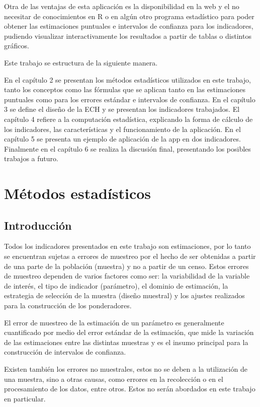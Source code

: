 \documentclass[12pt,twoside,spanish,a4paper]{book}\usepackage[]{graphicx}\usepackage[]{color}
\begin{document}
Otra de las ventajas de esta aplicación es la disponibilidad en la web y el no necesitar de conocimientos en R o en algún otro programa estadístico para poder obtener las estimaciones puntuales e intervalos de confianza para los indicadores, pudiendo visualizar interactivamente los resultados a partir de tablas o distintos gráficos.

Este trabajo se estructura de la siguiente manera.

En el capítulo 2 se presentan los métodos estadísticos utilizados en este trabajo, tanto los conceptos como las fórmulas que se aplican tanto en las estimaciones puntuales como para los errores estándar e intervalos de confianza. En el capítulo 3 se define el diseño de la ECH y se presentan los indicadores trabajados. El capítulo 4 refiere a la computación estadística, explicando la forma de cálculo de los indicadores, las características y el funcionamiento de la aplicación. En el capítulo 5 se presenta un ejemplo de aplicación de la app en dos indicadores. Finalmente en el capítulo 6 se realiza la discusión final, presentando los posibles trabajos a futuro.

\chapter{Métodos estadísticos \label{cap:Met}}

\section{Introducción \label{sec:in}}

Todos los indicadores presentados en este trabajo son estimaciones, por lo tanto se encuentran sujetas a errores de muestreo por el hecho de ser obtenidas a partir de una parte de la población (muestra) y no a partir de un censo. Estos errores de muestreo dependen de varios factores como ser: la variabilidad de la variable de interés, el tipo de indicador (parámetro), el dominio de estimación, la estrategia de selección de la muestra (diseño muestral) y los ajustes realizados para la construcción de los ponderadores.

El error de muestreo de la estimación de un parámetro es generalmente cuantificado por medio del error estándar de la estimación, que mide la variación de las estimaciones entre las distintas muestras y es el insumo principal para la construcción de intervalos de confianza.

Existen también los errores no muestrales, estos no se deben a la utilización de una muestra, sino a otras causas, como errores en la recolección o en el procesamiento de los datos, entre otros. Estos no serán abordados en este trabajo en particular.
\end{document}
